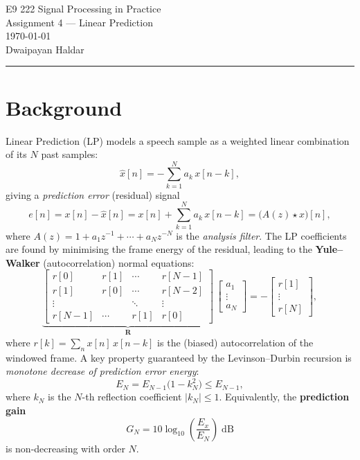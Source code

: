 \documentclass[12pt,a4paper,onecolumn]{exam}
\begin{document}
\begingroup
    \centering
    \LARGE E9 222 Signal Processing in Practice\\[0.3em]
    \LARGE Assignment 4 --- Linear Prediction\\[0.5em]
    \large \today\\[0.5em]
    \large Dwaipayan Haldar\par
\endgroup
\noindent\rule{\textwidth}{0.5pt}
\printanswers
\renewcommand{\solutiontitle}{\noindent\textbf{Ans:}\enspace}

\section*{Background}

Linear Prediction (LP) models a speech sample as a weighted linear combination
of its $N$ past samples:
\begin{equation}
  \hat{x}[n] = -\sum_{k=1}^{N} a_k\, x[n-k],
  \label{eq:predictor}
\end{equation}
giving a \emph{prediction error} (residual) signal
\begin{equation}
  e[n] = x[n] - \hat{x}[n] = x[n] + \sum_{k=1}^{N} a_k\, x[n-k]
       = \bigl(A(z) \star x\bigr)[n],
  \label{eq:residual}
\end{equation}
where $A(z) = 1 + a_1z^{-1} + \cdots + a_Nz^{-N}$ is the \emph{analysis filter}.
The LP coefficients are found by minimising the frame energy of the residual,
leading to the \textbf{Yule--Walker} (autocorrelation) normal equations:
\begin{equation}
  \underbrace{\begin{bmatrix}
    r[0] & r[1] & \cdots & r[N-1]\\
    r[1] & r[0] & \cdots & r[N-2]\\
    \vdots & & \ddots & \vdots\\
    r[N-1] & \cdots & r[1] & r[0]
  \end{bmatrix}}_{\mathbf{R}}\,
  \begin{bmatrix}a_1\\\vdots\\a_N\end{bmatrix}
  = -\begin{bmatrix}r[1]\\\vdots\\r[N]\end{bmatrix},
  \label{eq:yw}
\end{equation}
where $r[k]= \sum_n x[n]\,x[n-k]$ is the (biased) autocorrelation
of the windowed frame. A key property guaranteed by the Levinson--Durbin
recursion is \emph{monotone decrease of prediction error energy}:
\begin{equation}
  E_N = E_{N-1}\bigl(1-k_N^2\bigr) \leq E_{N-1},
  \label{eq:monotone}
\end{equation}
where $k_N$ is the $N$-th reflection coefficient $|k_N|\le 1$.
Equivalently, the \textbf{prediction gain}
\begin{equation}
  G_N = 10\log_{10}\!\left(\frac{E_x}{E_N}\right)\;\text{dB}
  \label{eq:predgain}
\end{equation}
is non-decreasing with order $N$.
\end{document}
